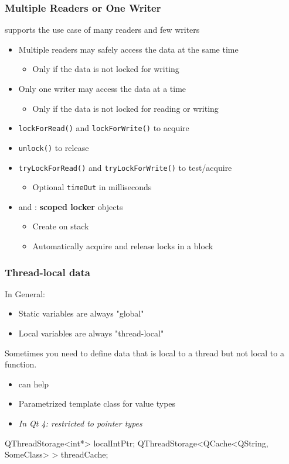\begin{slide}
\frametitle{Multiple Readers or One Writer}

 supports the use case of many readers and few writers
\begin{itemize}
\item Multiple readers may safely access the data at the same time
    \begin{itemize}
    \item Only if the data is not locked for writing
    \end{itemize}
\item Only one writer may access the data at a time
    \begin{itemize}
    \item Only if the data is not locked for reading or writing
    \end{itemize}

\item \texttt{lockForRead()} and \texttt{lockForWrite()} to acquire
\item \texttt{unlock()} to release
\item \texttt{tryLockForRead()} and \texttt{tryLockForWrite()} to test/acquire
    \begin{itemize}
    \item Optional \texttt{timeOut} in milliseconds
    \end{itemize}
\item {} and : \textbf{scoped locker} objects
    \begin{itemize}
    \item Create on stack
    \item Automatically acquire and release locks in a block
    \end{itemize}
\end{itemize}

\end{slide}
\begin{slide}[fragile]
\frametitle{Thread-local data}
In General:
\begin{itemize}
\item Static variables are always "global"
\item Local variables are always "thread-local"
\end{itemize}
Sometimes you need to define data that is local to a thread but not local
to a function.
\begin{itemize}
\item {} can help
\item Parametrized template class for value types
\item \textit{In Qt 4: restricted to pointer types}
\end{itemize}
\begin{cpp}
QThreadStorage<int*> localIntPtr;
QThreadStorage<QCache<QString, SomeClass> > threadCache;
\end{cpp}

\end{slide}

